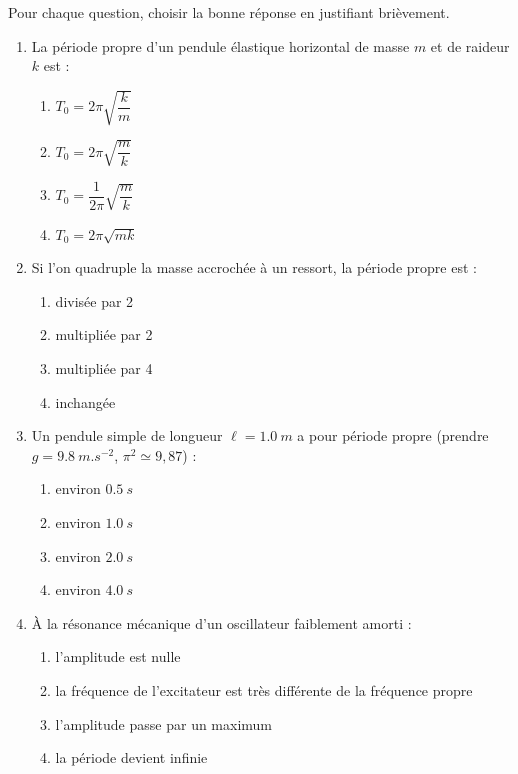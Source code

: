 \documentclass[11pt]{article}
\begin{document}
\begin{exercice}
Pour chaque question, choisir la bonne réponse en justifiant brièvement.
\begin{enumerate}
\item La période propre d'un pendule élastique horizontal de masse $m$ et de raideur $k$ est :
\begin{enumerate}
\item $T_0 = 2\pi\sqrt{\dfrac{k}{m}}$ \quad
\item $T_0 = 2\pi\sqrt{\dfrac{m}{k}}$ \quad
\item $T_0 = \dfrac{1}{2\pi}\sqrt{\dfrac{m}{k}}$ \quad
\item $T_0 = 2\pi\sqrt{mk}$
\end{enumerate}
\item Si l'on quadruple la masse accrochée à un ressort, la période propre est :
\begin{enumerate}
\item divisée par 2 \quad \item multipliée par 2 \quad \item multipliée par 4 \quad \item inchangée
\end{enumerate}
\item Un pendule simple de longueur $\ell = \SI{1,0}{m}$ a pour période propre (prendre $g = \SI{9,8}{m.s^{-2}}$, $\pi^2 \simeq 9,87$) :
\begin{enumerate}
\item environ $\SI{0,5}{s}$ \quad \item environ $\SI{1,0}{s}$ \quad \item environ $\SI{2,0}{s}$ \quad \item environ $\SI{4,0}{s}$
\end{enumerate}
\item À la résonance mécanique d'un oscillateur faiblement amorti :
\begin{enumerate}
\item l'amplitude est nulle \quad \item la fréquence de l'excitateur est très différente de la fréquence propre \quad \item l'amplitude passe par un maximum \quad \item la période devient infinie
\end{enumerate}
\end{enumerate}
\end{exercice}
\end{document}
